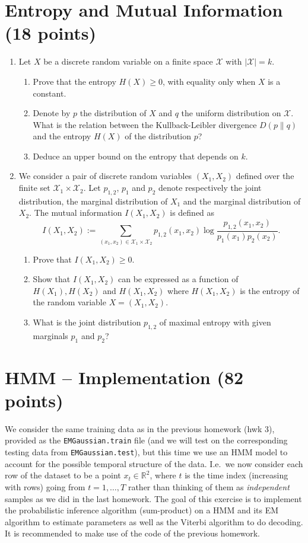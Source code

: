 \documentclass[12pt]{article}
\newcommand{\BNUM}{\begin{enumerate}}
\newcommand{\ENUM}{\end{enumerate}}
\newcommand{\1}{{\bf 1}}
\newcommand{\rb}{\mathbb{R}}
\begin{document}
\section{Entropy and Mutual Information (18 points)}
\BNUM
\item Let $X$ be a discrete random variable on a finite space $\mathcal{X}$ with $|\mathcal{X}|=k$.
\BNUM
\item Prove that the entropy $H(X) \geq 0$, with equality only when $X$ is a constant.
\item Denote by $p$ the distribution of $X$ and $q$ the uniform distribution on $\mathcal{X}$. What is the relation between the Kullback-Leibler divergence $D(p\|q)$ and the entropy $H(X)$ of the distribution $p$?
\item Deduce an upper bound on the entropy that depends on $k$.
\ENUM
\item We consider a pair of discrete random variables $(X_1,X_2)$ defined over the finite set $\mathcal{X}_1 \times \mathcal{X}_2$. Let $p_{1,2}$, $p_1$ and $p_2$ denote respectively the joint distribution, the marginal
distribution of $X_1$ and the marginal distribution of $X_2$. The mutual information $I(X_1,X_2)$ is defined as
$$I(X_1,X_2) :=\sum_{(x_1,x_2) \in \mathcal{X}_1 \times \mathcal{X}_2} p_{1,2}(x_1,x_2) \log \frac{p_{1,2}(x_1,x_2)}{p_{1}(x_1) p_2(x_2)}.$$
\BNUM
\item Prove that $I(X_1,X_2)\geq 0$.
\item Show that $I(X_1,X_2)$ can be expressed as a function of $H(X_1),H(X_2)$ and $H(X_1,X_2)$ where $H(X_1,X_2)$ is the entropy of the random variable $X=(X_1,X_2)$.
\item What is the joint distribution $p_{1,2}$ of maximal entropy with given marginals $p_1$ and $p_2$?
\ENUM 
\ENUM

\section{HMM -- Implementation (82 points)}

\sloppy
We consider the same training data as in the previous homework (hwk 3), provided as
the \texttt{EMGaussian.train} file (and we will test on the corresponding testing data from \texttt{EMGaussian.test}), but this time we use an HMM model to account for the possible temporal structure of the data.
I.e.~we now consider each row of the dataset to be a point $x_t \in \rb^2$, where $t$ is the time index (increasing with rows) going from $t = 1, \ldots, T$ rather than thinking of them as \emph{independent} samples as we did in the last homework. 
The goal of this exercise is to implement the probabilistic inference algorithm (sum-product) on a HMM and its EM algorithm to estimate parameters as well as the Viterbi algorithm to do decoding.
It is recommended to make use of the code of the previous homework.
\end{document}
